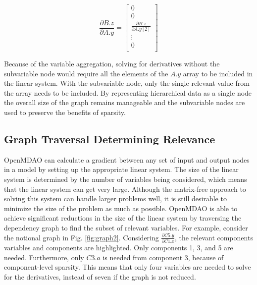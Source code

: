 \documentclass[]{aiaa-tc} %
\begin{document}
    \begin{equation}
        \frac{\partial B.z}{\partial A.y} =
        \begin{bmatrix}
            0 \\
            0 \\
            \frac{\partial B.z}{\partial A.y[2]} \\
            \vdots \\
            0 \\
        \end{bmatrix}
        \label{eqn:sparse_gradient}
    \end{equation}

    Because of the variable aggregation, solving for derivatives without the subvariable node would require 
    all the elements of the $A.y$ array to be included in the linear system.
    With the subvariable node, only the single relevant value from the array needs to be included.
    By representing hierarchical data as a single node the overall size of the graph
    remains manageable and the subvariable nodes are used to preserve the benefits of sparsity.


    \subsection{Graph Traversal Determining Relevance}

        OpenMDAO can calculate a gradient between any set of input and output nodes in a  
        model by setting up the appropriate linear system. The size of the linear system
        is determined by the number of variables being considered, which means that the linear
        system can get very large. Although the matrix-free approach to solving this system 
        can handle larger problems well, it is still desirable to minimize the size of the problem 
        as much as possible. OpenMDAO is able to achieve significant reductions in the
        size of the linear system by traversing the dependency graph to find the subset of relevant variables.
        For example, consider the notional graph in Fig. \ref{fig:graph2}. Considering $\frac{\partial C5.y}{\partial C1.x}$,
        the relevant components variables and components are highlighted. Only components 1, 3, and 5 are needed.
        Furthermore, only $C3.a$ is needed from component 3, because of component-level sparsity. 
        This means that only four variables are needed to solve for the derivatives, 
        instead of seven if the graph is not reduced. 
\end{document}
